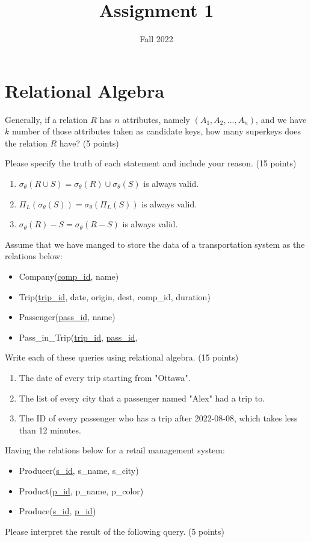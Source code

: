 \documentclass{homework}
\author{}
\date{Fall 2022}
\title{Assignment 1}
\begin{document}
 \maketitle

\section*{Relational Algebra}
\question Generally, if a relation $R$ has $n$ attributes, namely $ (A_1, A_2,... , A_n)$, and we have $k$ number of those attributes taken as candidate keys, how many superkeys does the relation $R$ have? (5 points)


\question Please specify the truth of each statement and include your reason. (15 points)
\begin{enumerate}
    \item $\sigma_\theta (R \cup S) = \sigma_\theta (R) \cup \sigma_\theta (S)$ is always valid.
    \item $\Pi_L (\sigma_\theta (S)) = \sigma_\theta (\Pi_L(S))$ is always valid.
    \item $\sigma_\theta(R)-S = \sigma_\theta(R-S)$ is always valid.
\end{enumerate}

\question Assume that we have manged to store the data of a transportation system as the relations below:
\begin{itemize}
    \item Company(\underline{comp\_id}, name)
	\item Trip(\underline{trip\_id}, date, origin, dest, comp\_id, duration)
    \item Passenger(\underline{pass\_id}, name)
    \item Pass\_in\_Trip(\underline{trip\_id}, \underline{pass\_id},
\end{itemize}

Write each of these queries using relational algebra. (15 points)
\begin{enumerate}
    \item The date of every trip starting from "Ottawa".
    \item The list of every city that a passenger named "Alex" had a trip to.
    \item The ID of every passenger who has a trip after 2022-08-08, which takes less than 12 minutes.
\end{enumerate}

\question Having the relations below for a retail management system:
\begin{itemize}
    \item Producer(\underline{s\_id}, s\_name, s\_city)
    \item Product(\underline{p\_id}, p\_name, p\_color)
    \item Produce(\underline{s\_id}, \underline{p\_id})
\end{itemize}
Please interpret the result of the following query. (5 points)
\end{document}
